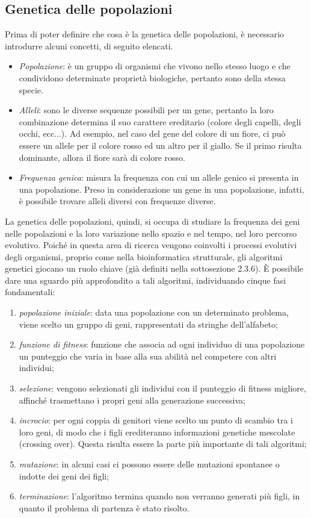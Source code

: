 \subsection{Genetica delle popolazioni}
Prima di poter definire che cosa è la genetica delle popolazioni, è necessario introdurre alcuni concetti, di seguito elencati.
\begin{itemize}
	\item \textit{Popolazione}: è un gruppo di organismi che vivono nello stesso luogo e che condividono determinate proprietà biologiche, pertanto sono della stessa specie.
	\item \textit{Alleli}: sono le diverse sequenze possibili per un gene, pertanto la loro combinazione determina il suo carattere ereditario (colore degli capelli, degli occhi, ecc...). Ad esempio, nel caso del gene del colore di un fiore, ci può essere un allele per il colore rosso ed un altro per il giallo. Se il primo risulta dominante, allora il fiore sarà di colore rosso.
	\item \textit{Frequenza genica}: misura la frequenza con cui un allele genico si presenta in una popolazione.
	\newline
	Preso in considerazione un gene in una popolazione, infatti, è possibile trovare alleli diversi con frequenze diverse.
\end{itemize}
La genetica delle popolazioni, quindi, si occupa di studiare la frequenza dei geni nelle popolazioni e la loro variazione nello spazio e nel tempo, nel loro percorso evolutivo.
\newline
Poiché in questa area di ricerca vengono coinvolti i processi evolutivi degli organismi, proprio come nella bioinformatica strutturale, gli algoritmi genetici giocano un ruolo chiave (già definiti nella sottosezione 2.3.6). 
\newline
\`E possibile dare una sguardo più approfondito a tali algoritmi, individuando cinque fasi fondamentali:
\begin{enumerate}
	\item \textit{popolazione iniziale}: data una popolazione con un determinato problema, viene scelto un gruppo di geni, rappresentati da stringhe dell'alfabeto;
	\item \textit{funzione di fitness}: funzione che associa ad ogni individuo di una popolazione un punteggio che varia in base alla sua abilità nel competere con altri individui;
	\item \textit{selezione}: vengono selezionati gli individui con il punteggio di fitness migliore, affinché trasmettano i propri geni alla generazione successiva;
	\item \textit{incrocio}: per ogni coppia di genitori viene scelto un punto di scambio tra i loro geni, di modo che i figli erediteranno informazioni genetiche mescolate (crossing over). Questa risulta essere la parte più importante di tali algoritmi;
	\item \textit{mutazione}: in alcuni casi ci possono essere delle mutazioni spontanee o indotte dei geni dei figli;
	\item \textit{terminazione}: l'algoritmo termina quando non verranno generati più figli, in quanto il problema di partenza è stato risolto.
\end{enumerate}

